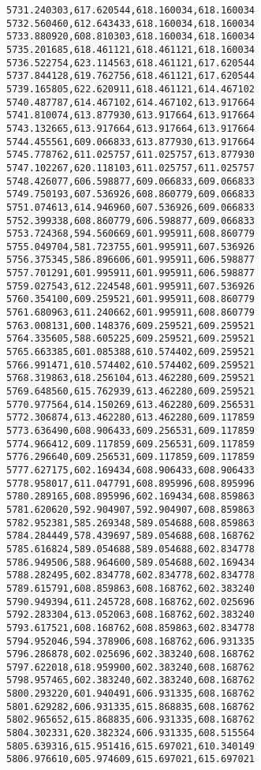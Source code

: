 \documentclass[11pt]{article}
\begin{document}
\begin{Verbatim}[commandchars=\\\{\}]
5731.240303,617.620544,618.160034,618.160034
5732.560460,612.643433,618.160034,618.160034
5733.880920,608.810303,618.160034,618.160034
5735.201685,618.461121,618.461121,618.160034
5736.522754,623.114563,618.461121,617.620544
5737.844128,619.762756,618.461121,617.620544
5739.165805,622.620911,618.461121,614.467102
5740.487787,614.467102,614.467102,613.917664
5741.810074,613.877930,613.917664,613.917664
5743.132665,613.917664,613.917664,613.917664
5744.455561,609.066833,613.877930,613.917664
5745.778762,611.025757,611.025757,613.877930
5747.102267,620.118103,611.025757,611.025757
5748.426077,606.598877,609.066833,609.066833
5749.750193,607.536926,608.860779,609.066833
5751.074613,614.946960,607.536926,609.066833
5752.399338,608.860779,606.598877,609.066833
5753.724368,594.560669,601.995911,608.860779
5755.049704,581.723755,601.995911,607.536926
5756.375345,586.896606,601.995911,606.598877
5757.701291,601.995911,601.995911,606.598877
5759.027543,612.224548,601.995911,607.536926
5760.354100,609.259521,601.995911,608.860779
5761.680963,611.240662,601.995911,608.860779
5763.008131,600.148376,609.259521,609.259521
5764.335605,588.605225,609.259521,609.259521
5765.663385,601.085388,610.574402,609.259521
5766.991471,610.574402,610.574402,609.259521
5768.319863,618.256104,613.462280,609.259521
5769.648560,615.762939,613.462280,609.259521
5770.977564,614.150269,613.462280,609.256531
5772.306874,613.462280,613.462280,609.117859
5773.636490,608.906433,609.256531,609.117859
5774.966412,609.117859,609.256531,609.117859
5776.296640,609.256531,609.117859,609.117859
5777.627175,602.169434,608.906433,608.906433
5778.958017,611.047791,608.895996,608.895996
5780.289165,608.895996,602.169434,608.859863
5781.620620,592.904907,592.904907,608.859863
5782.952381,585.269348,589.054688,608.859863
5784.284449,578.439697,589.054688,608.168762
5785.616824,589.054688,589.054688,602.834778
5786.949506,588.964600,589.054688,602.169434
5788.282495,602.834778,602.834778,602.834778
5789.615791,608.859863,608.168762,602.383240
5790.949394,611.245728,608.168762,602.025696
5792.283304,613.052063,608.168762,602.383240
5793.617521,608.168762,608.859863,602.834778
5794.952046,594.378906,608.168762,606.931335
5796.286878,602.025696,602.383240,608.168762
5797.622018,618.959900,602.383240,608.168762
5798.957465,602.383240,602.383240,608.168762
5800.293220,601.940491,606.931335,608.168762
5801.629282,606.931335,615.868835,608.168762
5802.965652,615.868835,606.931335,608.168762
5804.302331,620.382324,606.931335,608.515564
5805.639316,615.951416,615.697021,610.340149
5806.976610,605.974609,615.697021,615.697021

\end{Verbatim}
\end{document}
